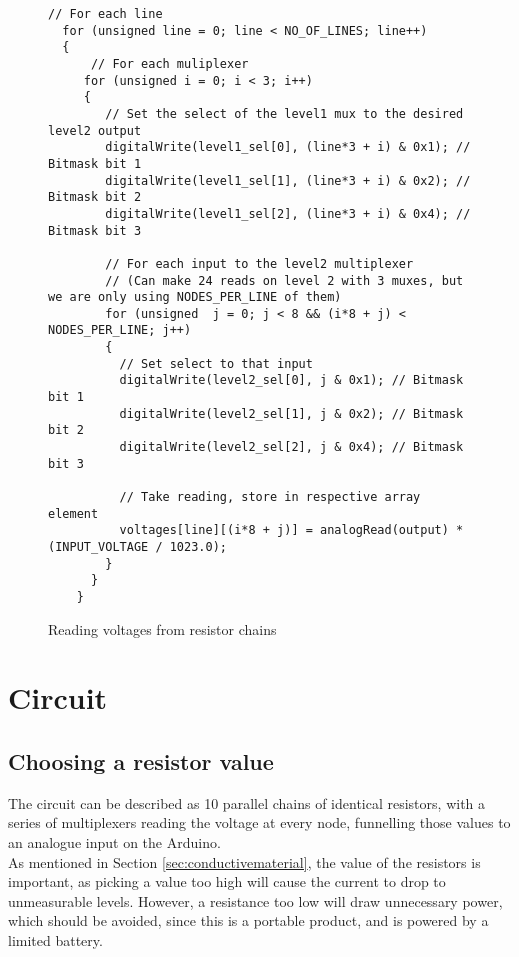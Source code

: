 \begin{figure}[H]
\centering
\begin{verbatim}
// For each line
  for (unsigned line = 0; line < NO_OF_LINES; line++)
  {
      // For each muliplexer
     for (unsigned i = 0; i < 3; i++)
     {
        // Set the select of the level1 mux to the desired level2 output
        digitalWrite(level1_sel[0], (line*3 + i) & 0x1); // Bitmask bit 1
        digitalWrite(level1_sel[1], (line*3 + i) & 0x2); // Bitmask bit 2
        digitalWrite(level1_sel[2], (line*3 + i) & 0x4); // Bitmask bit 3

        // For each input to the level2 multiplexer
        // (Can make 24 reads on level 2 with 3 muxes, but we are only using NODES_PER_LINE of them)
        for (unsigned  j = 0; j < 8 && (i*8 + j) < NODES_PER_LINE; j++) 
        {
          // Set select to that input
          digitalWrite(level2_sel[0], j & 0x1); // Bitmask bit 1
          digitalWrite(level2_sel[1], j & 0x2); // Bitmask bit 2
          digitalWrite(level2_sel[2], j & 0x4); // Bitmask bit 3

          // Take reading, store in respective array element
          voltages[line][(i*8 + j)] = analogRead(output) * (INPUT_VOLTAGE / 1023.0);
        }
      }
    }
\end{verbatim}
\caption{Reading voltages from resistor chains}
\label{lst:read_voltages}
\end{figure}


\section{Circuit}

\subsection{Choosing a resistor value}
The circuit can be described as 10 parallel chains of identical resistors, with a series of multiplexers reading the voltage at every node, funnelling those values to an analogue input on the Arduino. \\

As mentioned in Section \ref{sec:conductivematerial}, the value of the resistors is important, as picking a value too high will cause the current to drop to unmeasurable levels. However, a resistance too low will draw unnecessary power, which should be avoided, since this is a portable product, and is powered by a limited battery. \\

